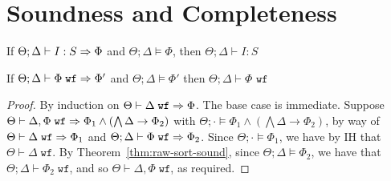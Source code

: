 \begin{mathpar}




\end{mathpar}


\section{Soundness and Completeness}

\begin{theorem}
If $\Theta;\Delta \vdash I : S \gens \Phi$ and $\Theta;\Delta \vDash \Phi$, then $\Theta;\Delta \vdash I : S$ 
\label{thm:raw-sort-sound}
\end{theorem}


\begin{theorem}
If $\Theta ; \Delta \vdash \Phi \; \texttt{wf} \gens \Phi'$ and $\Theta ; \Delta \vDash \Phi'$ then $\Theta ; \Delta \vdash \Phi \texttt{ wf}$
\label{thm:raw-constr-sound}
\end{theorem}


\idxctxwfsound*
\begin{proof}
By induction on $\Theta \vdash \Delta \; \texttt{wf} \gens \Phi$. The base case is immediate. Suppose $\Theta \vdash \Delta, \Phi \; \texttt{wf} \gens \Phi_1 \wedge (\bigwedge \Delta \to \Phi_2)$ with $\Theta ; \cdot \vDash \Phi_1 \wedge (\bigwedge \Delta \to \Phi_2)$, by way of
$\Theta \vdash \Delta \; \texttt{wf} \gens \Phi_1$ and $\Theta ; \Delta \vdash \Phi \; \texttt{wf} \gens \Phi_2$.
Since $\Theta ; \cdot \vDash \Phi_1$, we have by IH that $\Theta \vdash \Delta \; \texttt{wf}$. By Theorem~\ref{thm:raw-sort-sound}, since $\Theta ; \Delta \vDash \Phi_2$, we have that $\Theta ; \Delta \vdash \Phi_2 \; \texttt{wf}$, and so $\Theta \vdash \Delta, \Phi \; \texttt{wf}$, as required.
\end{proof}

